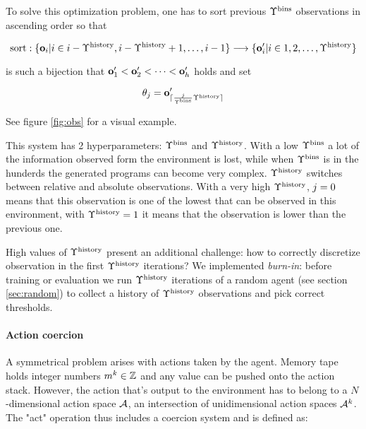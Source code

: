 To solve this optimization problem, one has to sort previous $\Upsilon^\text{bins}$ observations in ascending order so that 

\begin{equation}
    \text{sort}: \{\mathbf{o}_i | i \in i-\Upsilon^\text{history},i-\Upsilon^\text{history}+1,\dots,i-1\} \longrightarrow \{ \mathbf{o}'_i | i \in 1,2,\dots,\Upsilon^\text{history} \}
\end{equation}

is such a bijection that $\mathbf{o}'_1 < \mathbf{o}'_2 < \dots < \mathbf{o}'_h$ holds and set

\begin{equation}
    \theta_{j} = \mathbf{o}'_{\lceil \frac{j}{\Upsilon^\text{bins}} \Upsilon^\text{history} \rceil}
\end{equation}

See figure \ref{fig:obs} for a visual example.


This system has 2 hyperparameters: $\Upsilon^\text{bins}$ and $\Upsilon^\text{history}$.
With a low $\Upsilon^\text{bins}$ a lot of the information observed form the environment is lost, while when $\Upsilon^\text{bins}$ is in the hunderds the generated programs can become very complex.
$\Upsilon^\text{history}$ switches between relative and absolute observations.
With a very high $\Upsilon^\text{history}$, $j=0$ means that this observation is one of the lowest that can be observed in this environment, with $\Upsilon^\text{history}=1$ it means that the observation is lower than the previous one.

High values of $\Upsilon^\text{history}$ present an additional challenge: how to correctly discretize observation in the first $\Upsilon^\text{history}$ iterations?
We implemented \textit{burn-in}: before training or evaluation we run $\Upsilon^\text{history}$ iterations of a random agent (see section \ref{sec:random}) to collect a history of $\Upsilon^\text{history}$ observations and pick correct thresholds.

\paragraph{Action coercion}
\label{sec:act}

A symmetrical problem arises with actions taken by the agent. 
Memory tape holds integer numbers $m^k \in \mathbb{Z}$ and any value can be pushed onto the action stack.
However, the action that's output to the environment has to belong to a $N$-dimensional action space $\mathcal{A}$, an intersection of unidimensional action spaces $\mathcal{A}^k$.
The "act" operation thus includes a coercion system and is defined as:

